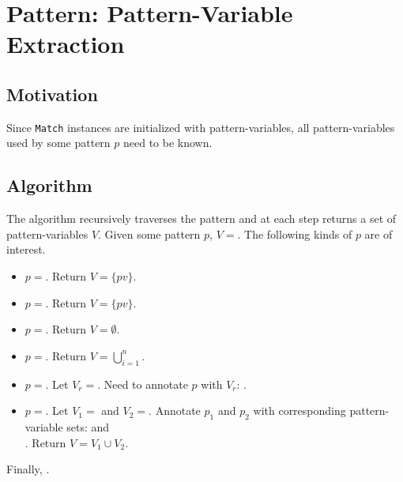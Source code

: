 \section{Pattern: Pattern-Variable Extraction}
\label{section:pv-extraction}

\subsection{Motivation}
Since \texttt{Match} instances are initialized with pattern-variables, all pattern-variables used by some pattern $p$ need to be known. 

\subsection{Algorithm}
The algorithm recursively traverses the pattern and at each step returns a set of pattern-variables $V$. Given some pattern $p$, $V=$\space {}. The following kinds of $p$ are of interest.

\begin{itemize}
\item $p=$\space \NonTerminal. Return $V = \{ pv \}$.
\item $p=$\space \BuiltInPattern. Return $V=\{ pv \}$.
\item $p=$\space \LiteralPattern. Return $V=\emptyset$.
\item $p=$\space \PatternSequence. Return $V=\bigcup_{i=1}^{n}$.
\item $p=$\space \PatternRepeat. Let $V_r=$. Need to annotate $p$ with $V_r$: .
\item $p=$\space \PatternInHole. Let $V_1=$ and  $V_2=$. Annotate $p_1$ and $p_2$ with corresponding pattern-variable sets:  and \\ . Return $V = V_1 \cup V_2$.
\end{itemize}

Finally, .
